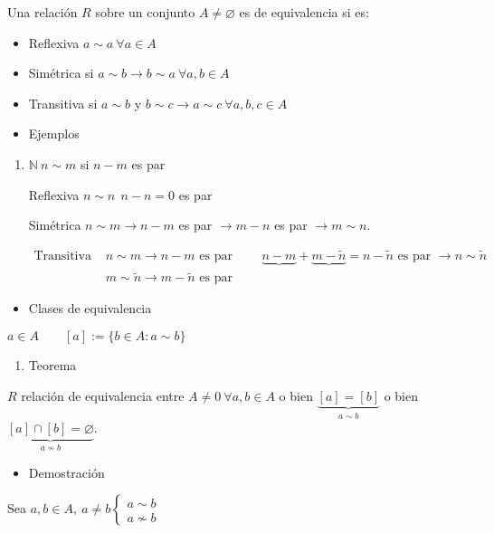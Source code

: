 \documentclass[12pt]{article}
\begin{document}
Una relación $R$ sobre un conjunto $A\neq\varnothing$ es de equivalencia  si es:
\begin{itemize}[label=$-$]
	\item Reflexiva $a\sim a~\forall a\in A$
	\item Simétrica si $a\sim b\rightarrow b\sim a~\forall a,b\in A$
	\item Transitiva si $a\sim b$ y $b\sim c\rightarrow a\sim c~\forall a,b,c\in A$
\end{itemize}
\begin{itemize}[label=\color{red}\textbullet, leftmargin=*]
	\item \color{lightblue}Ejemplos
\end{itemize}
\begin{enumerate}[label=\color{lightblue}\arabic*)]
	\item $\mathbb{N}~n\sim m$ si $n-m$ es par
	
	Reflexiva $n\sim n~~n-n=0$ es par
	
	Simétrica $n\sim m\rightarrow n-m$ es par $\rightarrow m-n$ es par $\rightarrow m\sim n$.
	
	$\begin{array}{ll}
		\text{Transitiva } & n\sim m\rightarrow n-m \text{ es par }\qquad \underbrace{n-m}+\underbrace{m-\tilde{n}}=n-\tilde{n} \text{ es par }\rightarrow n\sim \tilde{n}\\
		 & m\sim \tilde{n}\rightarrow m-\tilde{n}\text{ es par } 
	\end{array}$
\end{enumerate}
\begin{itemize}[label=\color{red}\textbullet, leftmargin=*]
	\item \color{lightblue}Clases de equivalencia
\end{itemize}
$a\in A\qquad [a]:=\{b\in A:a\sim b\}$
\begin{enumerate}[label=\arabic*)]
	\item Teorema
\end{enumerate}
$R$ relación de equivalencia entre $A\neq0~\forall a,b\in A$ o bien $\underbrace{[a]=[b]}_{\displaystyle a\sim b}$ o bien $\underbrace{[a]\cap[b]=\varnothing}_{\displaystyle a\nsim b}$.
\begin{itemize}[label=\color{red}\textbullet, leftmargin=*]
	\item \color{lightblue}Demostración
\end{itemize}
Sea $a,b\in A,~a\neq b\left\lbrace\begin{array}{l}
	a\sim b\\
	a\nsim b
\end{array}\right.$
\end{document}

